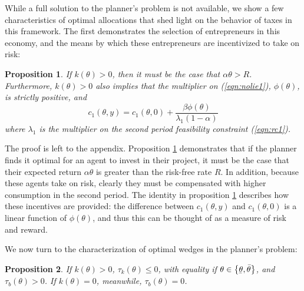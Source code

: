 \documentclass[11pt]{article}
\newcommand{\ubar}[1]{\underaccent{\bar}{#1}}
\newtheorem{proposition}{Proposition}
\begin{document}
While a full solution to the planner's problem is not available, we show a few characteristics of optimal allocations that shed light on the behavior of taxes in this framework. The first demonstrates the selection of entrepreneurs in this economy, and the means by which these entrepreneurs are incentivized to take on risk:

\begin{proposition} \label{prop:cutoff}
    If \( k\left( \theta \right) > 0 \), then it must be the case that \( \alpha\theta>R \). Furthermore, \( k\left( \theta \right) > 0 \) also implies that the multiplier on (\ref{eqn:nolie1}), \( \phi\left( \theta \right) \), is strictly positive, and 
    \[c_1\left( \theta,y \right) = c_1\left( \theta,0 \right) + \frac{\beta\phi\left( \theta \right)}{\lambda_1\left( 1-\alpha \right)}\]
    where \( \lambda_1 \) is the multiplier on the second period feasibility constraint (\ref{eqn:rc1}).
\end{proposition}

The proof is left to the appendix. Proposition \ref{prop:cutoff} demonstrates that if the planner finds it optimal for an agent to invest in their project, it must be the case that their expected return \( \alpha\theta \) is greater than the risk-free rate \( R \). In addition, because these agents take on risk, clearly they must be compensated with higher consumption in the second period. The identity in proposition \ref{prop:cutoff} describes how these incentives are provided: the difference between \( c_1\left( \theta,y \right) \) and \( c_1\left( \theta,0 \right) \) is a linear function of \( \phi(\theta) \), and thus this can be thought of as a measure of risk and reward. 

We now turn to the characterization of optimal wedges in the planner's problem:

\begin{proposition} \label{prop:wedges}
    If \( k\left( \theta \right) > 0 \), \( \tau_k\left( \theta \right) \le 0 \), with equality if \( \theta \in \left\{ \ubar{\theta}, \bar{\theta}\right\} \), and \( \tau_b\left( \theta \right) > 0 \). If \( k\left( \theta \right) = 0 \), meanwhile, \( \tau_b\left( \theta \right) = 0 \). 
\end{proposition}
\end{document}
